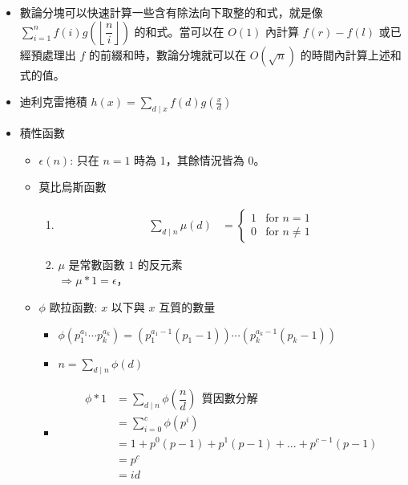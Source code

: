 \begin{itemize}
\item 數論分塊可以快速計算一些含有除法向下取整的和式，就是像 $\sum_{i = 1} ^ {n} f(i) g(\left\lfloor\dfrac ni\right\rfloor)$ 的和式。當可以在 $O(1)$ 內計算 $f(r) - f(l)$ 或已經預處理出 $f$ 的前綴和時，數論分塊就可以在 $O(\sqrt n)$ 的時間內計算上述和式的值。
\item 迪利克雷捲積 $h(x) = \sum_{d \mid x} f(d) g(\frac{x}{d})$
\item 積性函數
	\begin{itemize}
		\item $\epsilon (n)$: 只在 $n = 1$ 時為 1，其餘情況皆為 0。
		\item 莫比烏斯函數
			\begin{enumerate}
				\item $$
					\begin{aligned}
						\sum_{d \mid n} \mu (d)
						&=
						\begin{cases}
							1 & \text{for } n = 1\\
							0 & \text{for } n \neq 1
						\end{cases}
					\end{aligned}
					$$

				\item $\mu$ 是常數函數 $1$ 的反元素\\
					$\Rightarrow \mu \ast 1 = \epsilon$，
			\end{enumerate}

		\item $\phi$ 歐拉函數: $x$ 以下與 $x$ 互質的數量
		\begin{itemize}
			\item $\phi(p_1^{a_1} \cdots p_k^{a_k}) = (p_1^{a_1 - 1} (p_1 - 1)) \cdots (p_k^{a_k - 1} (p_k - 1))$
			\item $n = \sum_{d \mid n} \phi(d)$
			\item $$
				\begin{aligned}
				\phi \ast 1
				&= \sum_{d \mid n} \phi(\dfrac {n}{d}) \ \ \text{質因數分解}\\
				&= \sum_{i = 0} ^ {c} \phi(p ^ i)\\
				&= 1 + p^0(p-1) + p^1(p-1) + ... + p^{c-1}(p-1)\\
				&= p^c\\
				&= id
				\end{aligned}
				$$
		\end{itemize}
	\end{itemize}


\end{itemize}
